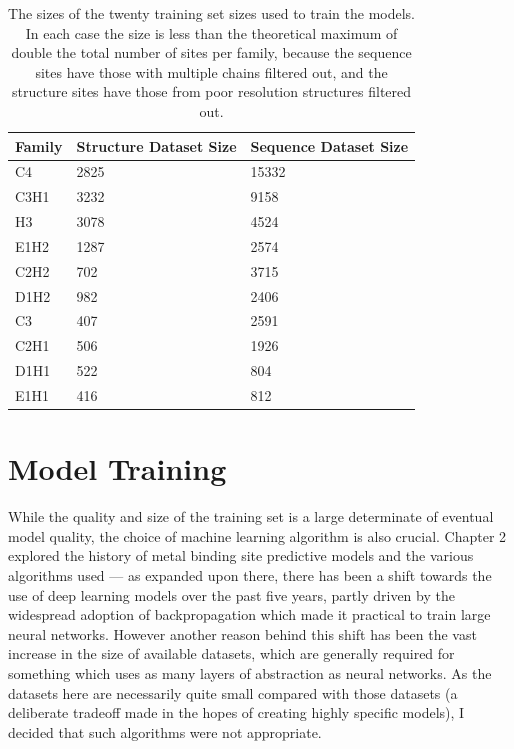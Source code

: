 \begin{table}
  \caption[Training set size.]{\label{tab:dataset-size}The sizes of the twenty training set sizes used to train the models. In each case the size is less than the theoretical maximum of double the total number of sites per family, because the sequence sites have those with multiple chains filtered out, and the structure sites have those from poor resolution structures filtered out.}
\begin{center}
\begin{tabular}{lll} \hline
Family & Structure Dataset Size & Sequence Dataset Size \\ \hline
C4     & 2825         &  15332  \\
C3H1   & 3232         &  9158   \\
H3     & 3078         &  4524   \\
E1H2   & 1287         &  2574   \\
C2H2   &  702         &  3715   \\
D1H2   &  982         &  2406   \\
C3     &  407         &  2591   \\
C2H1   &  506         &  1926   \\
D1H1   &  522         &  804    \\ 
E1H1   &  416         &  812    \\ \hline
\end{tabular}
\end{center}
\end{table}

\section{Model Training}

While the quality and size of the training set is a large determinate of eventual model quality, the choice of machine learning algorithm is also crucial. Chapter 2 explored the history of metal binding site predictive models and the various algorithms used --- as expanded upon there, there has been a shift towards the use of deep learning models over the past five years, partly driven by the widespread adoption of backpropagation which made it practical to train large neural networks. However another reason behind this shift has been the vast increase in the size of available datasets, which are generally required for something which uses as many layers of abstraction as neural networks. As the datasets here are necessarily quite small compared with those datasets (a deliberate tradeoff made in the hopes of creating highly specific models), I decided that such algorithms were not appropriate.

